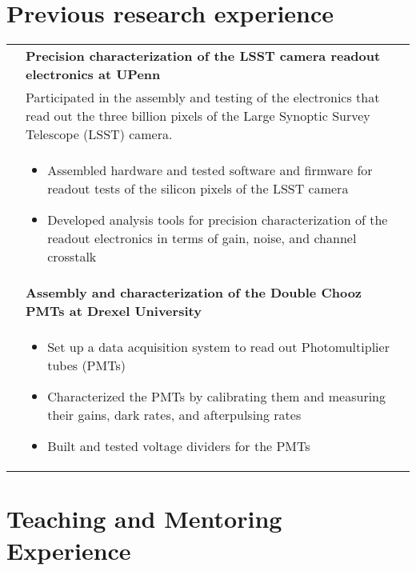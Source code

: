 \documentclass[a4paper,10pt]{article}
\begin{document}
\section{Previous research experience}
\begin{tabularx}{\textwidth}{>{\centering\arraybackslash}X p{} }

{\sl 2011--2012} & {\bf Precision characterization of the LSST camera readout electronics at UPenn}  \\

  & Participated in the assembly and testing of the electronics that read out the three billion pixels of the Large Synoptic
  Survey Telescope (LSST) camera. \\

  & \begin{itemize}
  \item Assembled hardware and tested software and firmware for readout tests of the silicon pixels of the LSST camera
  \item Developed analysis tools for precision characterization of the readout electronics in terms of gain, noise, and channel crosstalk
  \end{itemize} \\

  {\sl 2010--2011} &{\bf Assembly and characterization of the Double Chooz PMTs at Drexel University} \\
  & \begin{itemize}
  \item Set up a data acquisition system to read out Photomultiplier tubes (PMTs)
  \item Characterized the PMTs by calibrating them and measuring their gains, dark rates, and afterpulsing rates
  \item Built and tested voltage dividers for the PMTs
  \end{itemize}\\

\end{tabularx}

\vspace{3mm}
\section{Teaching and Mentoring Experience}
\end{document}
